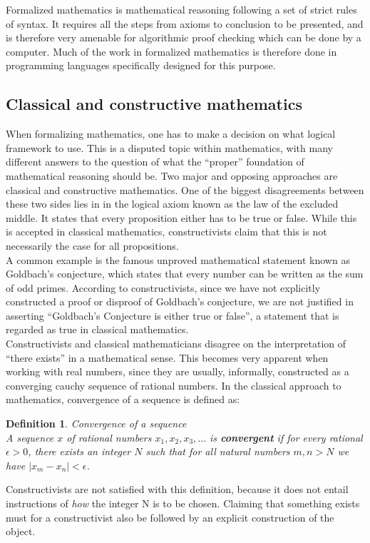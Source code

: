 \documentclass[11pt,a4paper]{article}
\begin{document}
Formalized mathematics is mathematical reasoning following a set of strict rules of syntax. It requires all the steps from axioms to conclusion to be presented, and is therefore very amenable for algorithmic proof checking which can be done by a computer. Much of the work in formalized mathematics is therefore done in programming languages specifically designed for this purpose.\\

\subsection{Classical and constructive mathematics}
When formalizing mathematics, one has to make a decision on what logical framework to use. This is a disputed topic within mathematics, with many different answers to the question of what the ``proper'' foundation of mathematical reasoning should be. Two major and opposing approaches are classical and constructive mathematics. One of the biggest disagreements between these two sides lies in in the logical axiom known as the law of the excluded middle. It states that every proposition either has to be true or false. While this is accepted in classical mathematics, constructivists claim that this is not necessarily the case for all propositions.\\
A common example is the famous unproved mathematical statement known as Goldbach's conjecture, which states that every number can be written as the sum of odd primes. According to constructivists, since we have not explicitly constructed a proof or disproof of Goldbach's conjecture, we are not justified in asserting ``Goldbach's Conjecture is either true or false'', a statement that is regarded as true in classical mathematics. \\
Constructivists and classical mathematicians disagree on the interpretation of ``there exists'' in a mathematical sense. This becomes very apparent when working with real numbers, since they are usually, informally, constructed as a converging cauchy sequence of rational numbers. In the classical approach to mathematics, convergence of a sequence is defined as:
\newtheorem{conv}{Definition}
\begin{conv}Convergence of a sequence\\
A sequence $x$ of rational numbers $x_1, x_2, x_3, \dots$ is \textbf{convergent} if for every rational $\epsilon > 0$, there exists an integer $N$ such that for all natural numbers $m, n > N$ we have $| x_m - x_n | < \epsilon$.
\end{conv}
Constructivists are not satisfied with this definition, because it does not entail instructions of \textit{how} the integer N is to be chosen. Claiming that something exists must for a constructivist also be followed by an explicit construction of the object.
\end{document}
